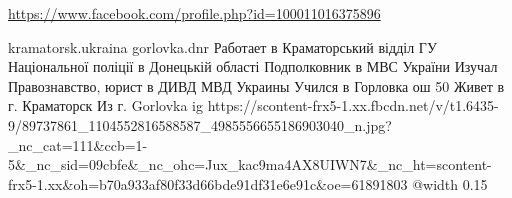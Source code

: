  
 
 
 
 

\url{https://www.facebook.com/profile.php?id=100011016375896}\par
kramatorsk.ukraina
gorlovka.dnr
Работает в Краматорський відділ ГУ Національної поліції в Донецькій області
Подполковник в МВС України
Изучал Правознавство, юрист в ДИВД МВД Украины
Учился в Горловка ош 50
Живет в г. Краматорск
Из г. Gorlovka
\ifcmt
  ig https://scontent-frx5-1.xx.fbcdn.net/v/t1.6435-9/89737861_1104552816588587_4985556655186903040_n.jpg?_nc_cat=111&ccb=1-5&_nc_sid=09cbfe&_nc_ohc=Jux_kac9ma4AX8UIWN7&_nc_ht=scontent-frx5-1.xx&oh=b70a933af80f33d66bde91df31e6e91c&oe=61891803
  @width 0.15
\fi

